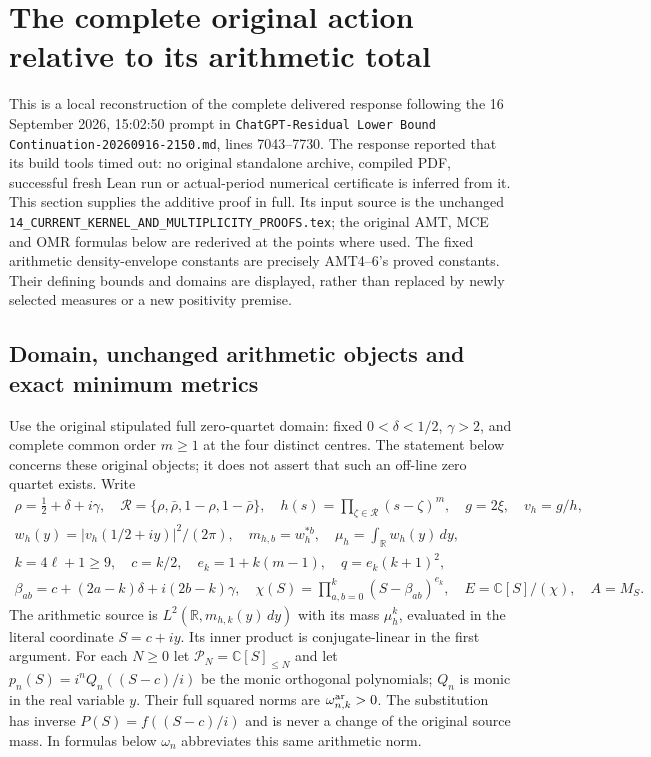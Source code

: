 \section{The complete original action relative to its arithmetic total}
\label{sec:complete-action-integration}

This is a local reconstruction of the complete delivered response following
the 16 September 2026, 15:02:50 prompt in
\texttt{ChatGPT-Residual Lower Bound Continuation-20260916-2150.md},
lines 7043--7730. The response reported that its build tools timed out:
no original standalone archive, compiled PDF, successful fresh Lean run or
actual-period numerical certificate is inferred from it. This section
supplies the additive proof in full. Its input source is the unchanged
\texttt{14\_CURRENT\_KERNEL\_AND\_MULTIPLICITY\_PROOFS.tex}; the original
AMT, MCE and OMR formulas below are rederived at the points where used.
The fixed arithmetic density-envelope constants are precisely AMT4--6's
proved constants. Their defining bounds and domains are displayed, rather
than replaced by newly selected measures or a new positivity premise.

\subsection{Domain, unchanged arithmetic objects and exact minimum metrics}

Use the original stipulated full zero-quartet domain: fixed
$0<\delta<1/2$, $\gamma>2$, and complete common order $m\ge1$ at the four
distinct centres. The statement below concerns these original objects; it
does not assert that such an off-line zero quartet exists. Write
\[
\begin{gathered}
 \rho=\tfrac12+\delta+i\gamma,\quad
 \mathcal R=\{\rho,\bar\rho,1-\rho,1-\bar\rho\},\quad
 h(s)=\prod_{\zeta\in\mathcal R}(s-\zeta)^m,\quad g=2\xi,\quad v_h=g/h,\\
 w_h(y)=|v_h(1/2+iy)|^2/(2\pi),\quad m_{h,b}=w_h^{*b},\quad
 \mu_h=\int_{\mathbb R}w_h(y)\,dy,\\
 k=4\ell+1\ge9,\quad c=k/2,\quad e_k=1+k(m-1),\quad
 q=e_k(k+1)^2,\\
 \beta_{ab}=c+(2a-k)\delta+i(2b-k)\gamma,\quad
 \chi(S)=\prod_{a,b=0}^{k}(S-\beta_{ab})^{e_k},\quad
 E=\mathbb C[S]/(\chi),\quad A=M_S.
\end{gathered}\tag{CAI1}
\]
The arithmetic source is $L^2(\mathbb R,m_{h,k}(y)\,dy)$ with its
mass $\mu_h^k$, evaluated in the literal coordinate $S=c+iy$.
Its inner product is conjugate-linear in the first argument. For each
$N\ge0$ let $\mathcal P_N=\mathbb C[S]_{\le N}$ and let
$p_n(S)=i^nQ_n((S-c)/i)$ be the monic orthogonal polynomials; $Q_n$ is
monic in the real variable $y$. Their full squared norms are
$\omega_{n,k}^{\rm ar}>0$. The substitution has inverse
$P(S)=f((S-c)/i)$ and is never a change of the original source mass.
In formulas below $\omega_n$ abbreviates this same arithmetic norm.


